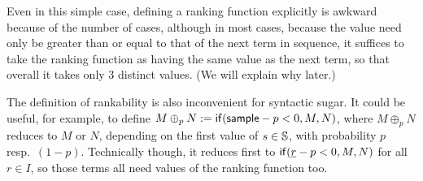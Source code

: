 Even in this simple case, defining a ranking function explicitly is awkward because of the number of cases, although in most cases, because the value need only be greater than or equal to that of the next term in sequence, it suffices to take the ranking function as having the same value as the next term, so that overall it takes only 3 distinct values.
(We will explain why later.)

The definition of rankability is also inconvenient for syntactic sugar. It could be useful, for example, to define \mbox{$M \oplus_p N := \mathsf{if}(\mathsf{sample} - p < 0, M, N)$}, where $M \oplus_p N$ reduces to $M$ or $N$, depending on the first value of $s \in {\mathbb{S}}$, with probability $p$ resp.~$(1-p)$. Technically though, it reduces first to $\mathsf{if}(\underline r - p < 0, M, N)$ for all $r \in I$, so those terms all need values of the ranking function too.

